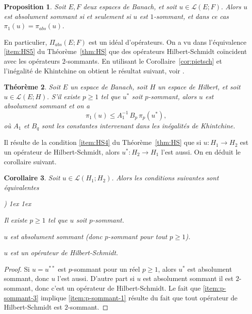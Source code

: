 \documentclass{smfart}
\theoremstyle{plain}
\newtheorem{theorem}{Théorème}[section]
\newtheorem{corollary}[theorem]{Corollaire}
\newtheorem{proposition}[theorem]{Proposition}
\theoremstyle{definition}
\newcommand {\BOUNDED} {{\mathcal L}}
\newcounter{aufzi}
\newenvironment{aufzi}{\begin{list}{ {\upshape\alph{aufzi})}}{
        \usecounter{aufzi}
        \topsep1ex
        \parsep0cm
        \itemsep1ex
        \leftmargin0.8cm
        \labelwidth0.5cm
        \labelsep0.3cm
}}
{\end{list}}
\begin{document}
\begin{proposition} \label{pro:abs-sommant-egal-1-sommant}
  Soit $E, F$ deux espaces de Banach, et soit $u \in {\mathcal
    L}(E; F)$. Alors $u$ est absolument sommant si et seulement si $u$
  est $1$-sommant, et dans ce cas $\pi_1(u)=\pi_{abs}(u)$.
\end{proposition}

\noindent En particulier, $\Pi_{abs}(E; F)$ est un idéal d'opérateurs.
On a vu dans l'équivalence \ref{item:HS5} du Théorème~\ref{thm:HS} que
des opérateurs Hilbert-Schmidt coïncident avec les opérateurs
$2$-sommants.  En utilisant le Corollaire~\ref{cor:pietsch} et
l'inégalité de Khintchine on obtient le résultat suivant, voir
\cite[Théorème~2.21.]{DJT}.

\begin{theorem} Soit $E$ un espace de Banach, soit $H$ un espace de
  Hilbert, et soit $u \in \BOUNDED(E;H)$. S'il existe $p \ge 1$
  tel que $u^*$ soit $p$-sommant, alors $u$ est absolument sommant et
  on a
\[
    \pi_1(u)\le A_1^{-1}\, B_p\,  \pi_p(u^*),
\]
où $A_1$ et $B_q$ sont les constantes intervenant dans les
inégalités de Khintchine.
\end{theorem}

\noindent Il résulte de la condition \ref{item:HS4} du
Théorème~\ref{thm:HS} que si $u:H_1\to H_2$ est un opérateur de
Hilbert-Schmidt, alors $u^*:H_2\to H_1$ l'est aussi. On en déduit le
corollaire suivant.

\begin{corollary} \label{coro:sur-Hilbert-p-sommant-egal-HS}
  Soit $u\in\BOUNDED(H_1;H_2)$. Alors les conditions suivantes
  sont équivalentes
  \begin{aufzi}
  \item \label{item:p-sommant-1} Il existe $p \ge 1$ tel que $u$ soit $p$-sommant.
  \item \label{item:p-sommant-2} $u$ est absolument sommant (donc $p$-sommant pour tout $p\ge 1$).
  \item \label{item:p-sommant-3} $u$ est un opérateur de  Hilbert-Schmidt.
  \end{aufzi}
\end{corollary}

\begin{proof} Si $u=u^{**}$ est $p$-sommant pour un réel $p\ge 1$,
  alors $u^*$ est absolument sommant, donc $u$ l'est aussi. D'autre
  part si $u$ est absolument sommant il est $2$- sommant, donc c'est
  un opérateur de Hilbert-Schmidt. Le fait que
  \ref{item:p-sommant-3} implique \ref{item:p-sommant-1} résulte du
  fait que tout opérateur de Hilbert-Schmidt est $2$-sommant.
\end{proof}
\end{document}

